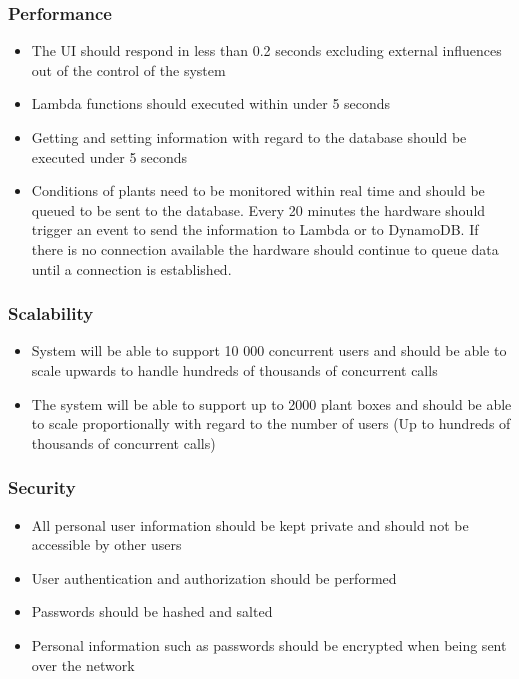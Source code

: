\documentclass{article}
\begin{document}
\subsubsection{Performance}
	\begin{itemize}
		\item The UI should respond in less than 0.2 seconds excluding external influences out of the control of the system
		\item Lambda functions should executed within under 5 seconds
		\item Getting and setting information with regard to the database should be executed under 5 seconds
		\item Conditions of plants need to be monitored within real time and should be queued to be sent to the database. Every 20 minutes the hardware should trigger an event to send the information to Lambda or to DynamoDB. If there is no connection available the hardware should continue to queue data until a connection is established.
	\end{itemize}
\subsubsection{Scalability}
	\begin{itemize}
		\item System will be able to support 10 000 concurrent users and should be able to scale upwards to handle hundreds of thousands of concurrent calls
		\item The system will be able to support up to 2000 plant boxes and should be able to scale proportionally with regard to the number of users (Up to hundreds of thousands of concurrent calls)
	\end{itemize}
\subsubsection{Security}
	\begin{itemize}
		\item All personal user information should be kept private and should not be accessible by other users
		\item User authentication and authorization should be performed
		\item Passwords should be hashed and salted
		\item Personal information such as passwords should be encrypted when being sent over the network
	\end{itemize}
\end{document}
